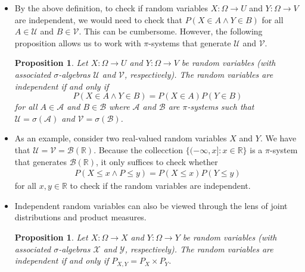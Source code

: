 \documentclass[10pt]{article}
\newtheorem{theorem}[lemma]{Theorem}
\newtheorem{proposition}[lemma]{Proposition}
\numberwithin{lemma}{section}
\newcommand{\mcal}[1]{\mathcal{#1}}
\newcommand{\Real}{\mathbb{R}}
\newcommand{\Nat}{\mathbb{N}}
\begin{document}
\begin{itemize}
  \item By the above definition, to check if random variables $X: \Omega \rightarrow U$ and $Y: \Omega \rightarrow V$ are independent, we would need to check that $P(X \in A \wedge Y \in B)$ for all $A \in \mcal{U}$ and $B \in \mcal{V}$. This can be cumbersome. However, the following proposition allows us to work with $\pi$-systems that generate $\mcal{U}$ and $\mcal{V}$.
  
  \begin{proposition}
    Let $X: \Omega \rightarrow U$ and $Y: \Omega \rightarrow V$ be random variables (with associated $\sigma$-algebras $\mcal{U}$ and $\mcal{V}$, respectively). The random variables are independent if and only if $$P(X \in A \wedge Y \in B) = P(X \in A)P(Y \in B)$$ for all $A \in \mcal{A}$ and $B \in \mcal{B}$ where $\mcal{A}$ and $\mcal{B}$ are $\pi$-systems such that $\mcal{U} = \sigma(\mcal{A})$ and $\mcal{V} = \sigma(\mcal{B})$.
  \end{proposition}

  \item As an example, consider two real-valued random variables $X$ and $Y$. We have that $\mcal{U} = \mcal{V} = \mcal{B}(\Real)$. Because the collecction $\{ (-\infty, x] : x \in \Real\}$ is a $\pi$-system that generates $\mcal{B}(\Real)$, it only suffices to check whether
  \begin{align*}
    P(X \leq x \wedge P \leq y) = P(X \leq x)P(Y \leq y)
  \end{align*}
  for all $x,y \in \Real$ to check if the random variables are independent.

  \item Independent random variables can also be viewed through the lens of joint distributions and product measures.
  \begin{proposition}
    Let $X: \Omega \rightarrow X$ and $Y: \Omega \rightarrow Y$ be random variables (with associated $\sigma$-algebras $\mcal{X}$ and $\mcal{Y}$, respectively).
    The random variables are independent if and only if $P_{X,Y} = P_X \times P_Y$.
  \end{proposition}

\begin{comment}
  \item \begin{theorem}[second Borel--Cantelli lemma]
    If $\{ E_n : n \in \Nat \}$ be a sequence of independent events, then
    \begin{align*}
      \sum_{n=1}^\infty P(E_n) = \infty \implies P(\limsup_{n \rightarrow \infty} E_n) = 1.
    \end{align*}
  \end{theorem}
  Note that $\limsup_{n \rightarrow \infty} E_n$ is the set of elements in $\Omega$ that occurs in infinitely many events in the sequence. Hence, if $\sum P(E_n) > \infty$, then ``occurs in infinitely many events'' is a property that is true almost everywhere in $\Omega$.


\end{comment}
\end{itemize}
\end{document}
